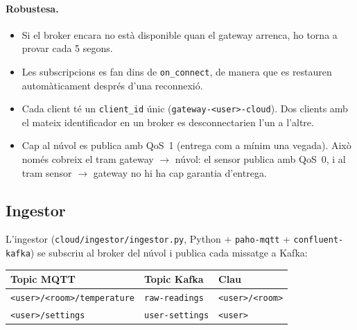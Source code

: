 \documentclass[11pt,a4paper]{article}
\begin{document}
\paragraph{Robustesa.}
\begin{itemize}
  \item Si el broker encara no està disponible quan el gateway arrenca, ho
        torna a provar cada 5 segons.
  \item Les subscripcions es fan dins de \texttt{on\_connect}, de manera que
        es restauren automàticament després d'una reconnexió.
  \item Cada client té un \texttt{client\_id} únic
        (\texttt{gateway-<user>-cloud}). Dos clients amb el mateix
        identificador en un broker es desconnectarien l'un a l'altre.
  \item Cap al núvol es publica amb QoS~1 (entrega com a mínim una vegada).
        Això només cobreix el tram gateway $\rightarrow$ núvol: el sensor
        publica amb QoS~0, i al tram sensor $\rightarrow$ gateway no hi ha
        cap garantia d'entrega.
\end{itemize}

\subsection{Ingestor}

L'ingestor (\texttt{cloud/ingestor/ingestor.py}, Python + \texttt{paho-mqtt}
+ \texttt{confluent-kafka}) se subscriu al broker del núvol i publica cada
missatge a Kafka:

\begin{center}
\begin{tabular}{@{}lll@{}}
\toprule
Topic MQTT & Topic Kafka & Clau \\
\midrule
\texttt{<user>/<room>/temperature} & \texttt{raw-readings} & \texttt{<user>/<room>} \\
\texttt{<user>/settings} & \texttt{user-settings} & \texttt{<user>} \\
\bottomrule
\end{tabular}
\end{center}
\end{document}
